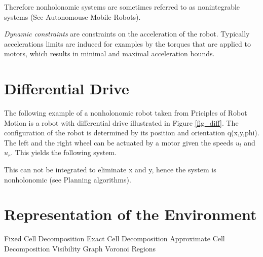 Therefore nonholonomic systems are sometimes referred to as nonintegrable systems (See Autonomouse Mobile Robots).

\emph{Dynamic constraints} are constraints on the acceleration of the robot. Typically accelerations limits are induced for examples by the torques that are applied to motors, which results in minimal and maximal acceleration bounds.

\section{Differential Drive}\label{sec:ddrive}
The following example of a nonholonomic robot taken from Priciples of Robot Motion is a robot with differential drive illustrated in Figure \ref{fig_diff}.
The configuration of the robot is determined by its position and orientation q(x,y,phi).
The left and the right wheel can be actuated by a motor given the speeds $u_l$ and $u_r$.
This yields the following system.

This can not be integrated to eliminate x and y, hence the system is nonholonomic (see Planning algorithms).

\section{Representation of the Environment}\label{sec:representation}
Fixed Cell Decomposition
Exact Cell Decomposition
Approximate Cell Decomposition
Visibility Graph
Voronoi Regions

